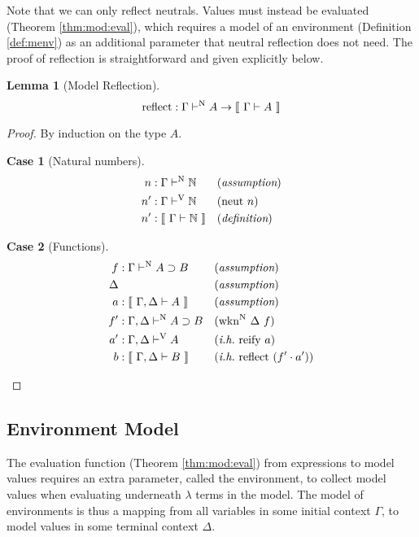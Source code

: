 \documentclass[preprint,nonatbib]{sigplanconf}
\numberwithin{subdefin}{defin}
\theoremstyle{definition}
\numberwithin{subtheorem}{theorem}
\newtheorem{sublemma}{Lemma}
\numberwithin{sublemma}{theorem}
\numberwithin{corollary}{theorem}
\numberwithin{case}{theorem}
\newtheorem{slcase}{Case}
\numberwithin{slcase}{sublemma}
\numberwithin{scase}{subtheorem}
\numberwithin{lcase}{lemma}
\newcommand{\refdef}[1]{Definition \ref{def:#1}}
\newcommand{\refthm}[1]{Theorem \ref{thm:#1}}
\def\arr{\supset}
\def\marr{\rightarrow}
\def\nat{\mathbb{N}}
\def\bydef{(\textit{definition})}
\def\byass{(\textit{assumption})}
\newcommand{\ih}[1]{(\textit{i.h.}~ #1)}
\newcommand{\by}[1]{(#1)}
\newcommand{\turn}[1]{\vdash^\con{#1}}
\newcommand{\el}[1]{\llbracket ~ #1 ~ \rrbracket}
\newcommand{\wknn}[1]{\fun{wkn}^\con{N} ~ \Delta ~ #1}
\newcommand{\con}[1]{\textmd{#1}}
\newcommand{\fun}[1]{\textmd{#1}}
\newcommand{\typm}[1]{\el{\Gamma \vdash #1}}
\newcommand{\gdtypm}[1]{\el{\Gamma, \Delta \vdash #1}}
\newcommand{\typv}[1]{\Gamma \turn{V} #1}
\newcommand{\gdtypv}[1]{\Gamma, \Delta \turn{V} #1}
\newcommand{\typn}[1]{\Gamma \turn{N} #1}
\newcommand{\gdtypn}[1]{\Gamma, \Delta \turn{N} #1}
\begin{document}
Note that we can only reflect neutrals. Values must instead be
evaluated (\refthm{mod:eval}), which requires a model of an
environment (\refdef{menv}) as an additional parameter that neutral reflection does
not need. The proof of reflection is straightforward and given explicitly
below. 

\begin{sublemma}[Model Reflection]
\label{lem:mod:reflect}
$$
\fun{reflect} : \typn{A} \marr \typm{A}
$$

\begin{proof}

By induction on the type $A$.

\begin{slcase}[Natural numbers]
\begin{align*}
n  &: \typn{\nat} && \byass\\
n' &: \typv{\nat} && \by{\con{neut}~n}\\
n' &: \typm{\nat} && \bydef
\end{align*}
\end{slcase}

\begin{slcase}[Functions]
\begin{align*}
f &: \typn{A \arr B} && \byass\\
\Delta& && \byass\\
a  &: \gdtypm{A} && \byass\\
f' &: \gdtypn{A \arr B} && \by{\wknn{f}}\\
a' &: \gdtypv{A} && \ih{\fun{reify}~a}\\
b  &: \gdtypm{B} && \ih{\fun{reflect}~(f' \cdot a')}
\end{align*}
\end{slcase}

\end{proof}

\end{sublemma}

\subsection{Environment Model}

The evaluation function (\refthm{mod:eval}) from expressions to model
values requires an extra parameter, called the environment, to collect
model values when evaluating underneath $\lambda$ terms in the model.
The model of environments is thus a mapping from all variables in some initial context
$\Gamma$, to model values in some terminal context $\Delta$.
\end{document}
